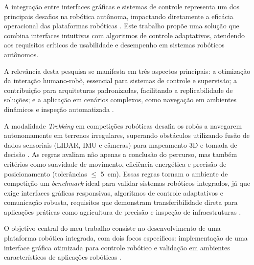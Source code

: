 
A integração entre interfaces gráficas e sistemas de controle representa um dos principais desafios na robótica autônoma, impactando diretamente a eficácia operacional das plataformas robóticas \cite{IntroAR, IntroROS}. Este trabalho propõe uma solução que combina interfaces intuitivas com algoritmos de controle adaptativos, atendendo aos requisitos críticos de usabilidade e desempenho em sistemas robóticos autônomos.


A relevância desta pesquisa se manifesta em três aspectos principais: a otimização da interação humano-robô, essencial para sistemas de controle e supervisão; a contribuição para arquiteturas padronizadas, facilitando a replicabilidade de soluções; e a aplicação em cenários complexos, como navegação em ambientes dinâmicos e inspeção automatizada \cite{IntroROS}.


A modalidade \textit{Trekking} em competições robóticas desafia os robôs a navegarem autonomamente em terrenos irregulares, superando obstáculos utilizando fusão de dados sensoriais (LIDAR, IMU e câmeras) para mapeamento 3D e tomada de decisão \cite{KleytinhoBasico}. As regras avaliam não apenas a conclusão do percurso, mas também critérios como suavidade de movimento, eficiência energética e precisão de posicionamento (tolerâncias $\leq$ 5~cm). Essas regras tornam o ambiente de competição um \textit{benchmark} ideal para validar sistemas robóticos integrados, já que exige interfaces gráficas responsivas, algoritmos de controle adaptativos e comunicação robusta, requisitos que demonstram transferibilidade direta para aplicações práticas como agricultura de precisão e inspeção de infraestruturas \cite{KleytinhoBasico}.


O objetivo central do meu trabalho consiste no desenvolvimento de uma plataforma robótica integrada, com dois focos específicos: implementação de uma interface gráfica otimizada para controle robótico e validação em ambientes característicos de aplicações robóticas \cite{IntroAR, IntroROS}.

